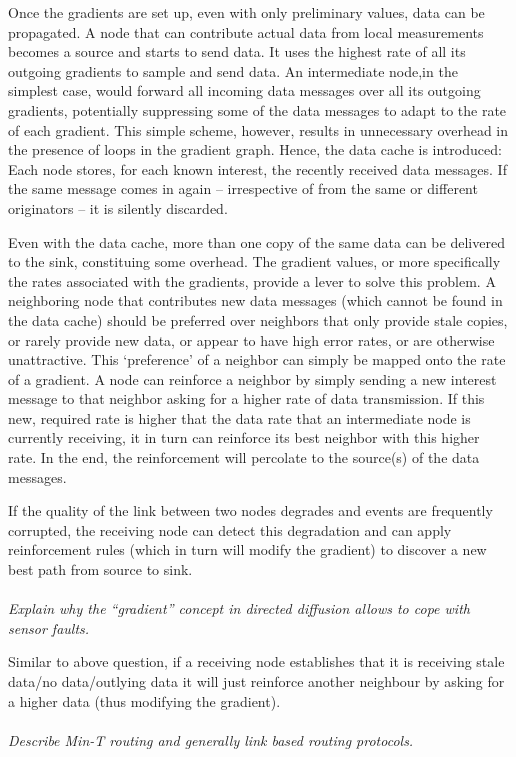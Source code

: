 \documentclass[12pt]{article}
\newcommand*\circled[1]{\tikz[baseline=(char.base)]{
		\node[shape=circle,draw,inner sep=0pt] (char) {#1};}}
\begin{document}
Once the gradients are set up, even with only preliminary values, data can be
propagated. A node that can contribute actual data from local measurements
becomes a source and starts to send data. It uses the highest rate of all its
outgoing gradients to sample and send data. An intermediate node,in the
simplest case, would forward all incoming data messages over all its outgoing
gradients, potentially suppressing some of the data messages to adapt to the
rate of each gradient. This simple scheme, however, results in unnecessary
overhead in the presence of loops in the gradient graph. Hence, the data cache
is introduced: Each node stores, for each known interest, the recently received
data messages. If the same message comes in again -- irrespective of from the
same or different originators -- it is silently discarded.

Even with the data cache, more than one copy of the same data can be delivered
to the sink, constituing some overhead. The gradient values, or more
specifically the rates associated with the gradients, provide a lever to solve
this problem. A neighboring node that contributes new data messages (which
cannot be found in the data cache) should be preferred over neighbors that only
provide stale copies, or rarely provide new data, or appear to have high error
rates, or are otherwise unattractive. This `preference' of a neighbor can
simply be mapped onto the rate of a gradient. A node can reinforce a neighbor
by simply sending a new interest message to that neighbor asking for a higher
rate of data transmission. If this new, required rate is higher that the data
rate that an intermediate node is currently receiving, it in turn can reinforce
its best neighbor with this higher rate. In the end, the reinforcement will
percolate to the source(s) of the data messages.

If the quality of the link between two nodes degrades and events are frequently
corrupted, the receiving node can detect this degradation and can apply
reinforcement rules (which in turn will modify the gradient) to discover a new
best path from source to sink. 
\\
\\
\textit{\circled{9.} Explain why the ``gradient'' concept in directed diffusion
allows to cope with sensor faults.}

Similar to above question, if a receiving node establishes that it is receiving
stale data/no data/outlying data it will just reinforce another neighbour by
asking for a higher data (thus modifying the gradient).
\\
\\
\textit{\circled{10.} Describe Min-T routing and generally link based routing
protocols.}
\end{document}
